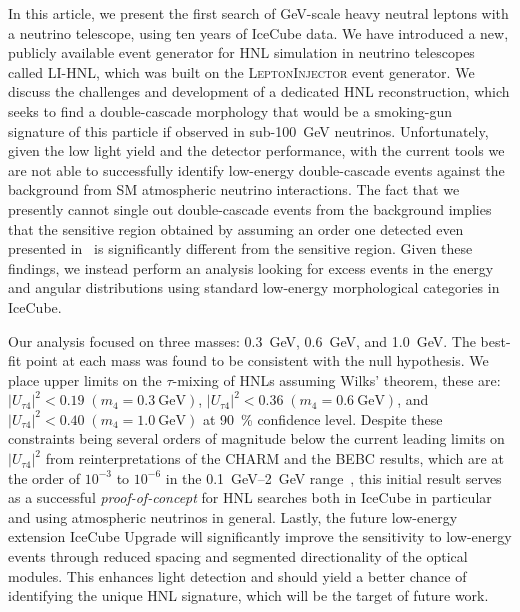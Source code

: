 \documentclass[
    aps,
    prd,
    reprint,
    amsmath,
    amssymb,
    nofootinbib,
    linenumbers,
    superscriptaddress,
    floatfix
]{revtex4-2}
\newcommand{\gev}{\giga\electronvolt}
\def\ut4{$|U_{\tau4}|^2$}
\def\nomathut4{|U_{\tau4}|^2}
\begin{document}
In this article, we present the first search of GeV-scale heavy neutral leptons with a neutrino telescope, using ten years of IceCube data.
We have introduced a new, publicly available event generator for HNL simulation in neutrino telescopes called \textsc{LI-HNL}, which was built on the \textsc{LeptonInjector} event generator.
We discuss the challenges and development of a dedicated HNL reconstruction, which seeks to find a double-cascade morphology that would be a smoking-gun signature of this particle if observed in sub-\SI{100}{\gev} neutrinos.
Unfortunately, given the low light yield and the detector performance, with the current tools we are not able to successfully identify low-energy double-cascade events against the background from SM atmospheric neutrino interactions.
The fact that we presently cannot single out double-cascade events from the background implies that the sensitive region obtained by assuming an order one detected even presented in~\cite{Coloma:2017ppo} is significantly different from the sensitive region.
Given these findings, we instead perform an analysis looking for excess events in the energy and angular distributions using standard low-energy morphological categories in IceCube.

Our analysis focused on three masses: \SI{0.3}{\gev}, \SI{0.6}{\gev}, and \SI{1.0}{\gev}. 
The best-fit point at each mass was found to be consistent with the null hypothesis. 
We place upper limits on the $\tau$-mixing of HNLs assuming Wilks' theorem, these are:
$\nomathut4 < 0.19\;(m_4 = \SI{0.3}{\gev})$, $\nomathut4 < 0.36\;(m_4 = \SI{0.6}{\gev})$, and $\nomathut4 < 0.40\;(m_4 = \SI{1.0}{\gev})$ at \SI{90}{\percent} confidence level.
Despite these constraints being several orders of magnitude below the current leading limits on \ut4 from reinterpretations of the CHARM and the BEBC results, which are at the order of $10^{-3}$ to $10^{-6}$ in the \SIrange{0.1}{2}{\gev} range~\cite{Orloff:2002de, Boiarska:2021yho, Barouki:2022bkt}, this initial result serves as a successful \textit{proof-of-concept} for HNL searches both in IceCube in particular and using atmospheric neutrinos in general.
Lastly, the future low-energy extension IceCube Upgrade will significantly improve the sensitivity to low-energy events through reduced spacing and segmented directionality of the optical modules.
This enhances light detection and should yield a better chance of identifying the unique HNL signature, which will be the target of future work.



\end{document}
